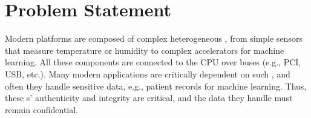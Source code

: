 \section{Problem Statement}
\label{sec:problemStatement}



Modern platforms are composed of complex heterogeneous \sphw, from simple sensors that measure temperature or humidity to complex accelerators for machine learning. All these components are connected to the CPU over buses (e.g., PCI, USB, etc.). %
Many modern applications are critically dependent on such \sphw, and often they handle sensitive data, e.g., patient records for machine learning. Thus, these \sphw{}s' authenticity and integrity are critical, and the data they handle must remain confidential. 


    
